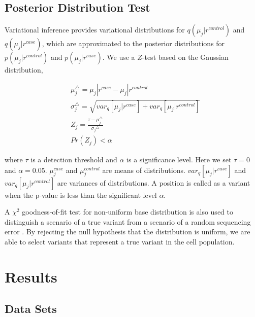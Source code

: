 \documentclass[11pt,reqno]{amsart}
\begin{document}
\subsection{Posterior Distribution Test}
Variational inference provides variational distributions for $q(\mu_j|r^{control})$ and $q(\mu_j|r^{case})$, which are approximated to the posterior distributions for $p(\mu_j|r^{control})$ and $p(\mu_j|r^{case})$.
We use a $Z$-test based on the Gaussian distribution,

\begin{align}
\label{eq:test}
& \mu_j^{\triangle} = \mu_j|r^{case}-\mu_j|r^{control}\\
& \sigma_j^{\triangle} = \sqrt {var_q{[\mu_j|r^{case}]} + var_q{[\mu_j|r^{control}]}}\\
& Z_j = \frac{\tau - \mu_j^{\triangle}}{{\sigma_j}^{\triangle}}\\
& Pr(Z_j) < \alpha
\end{align}

where $\tau$ is a detection threshold and $\alpha$ is a significance level. Here we set $\tau = 0$ and $\alpha = 0.05$.
$\mu_j^{case}$ and $\mu_j^{control}$ are means of distributions.
$var_q{[\mu_j|r^{case}]}$ and  $var_q{[\mu_j|r^{control}]}$ are variances of distributions.
A position is called as a variant when the p-value is less than the significant level $\alpha$.

A $\chi^2$ goodness-of-fit test for non-uniform base distribution is also used to distinguish a scenario of a true variant from a scenario of a random sequencing error \citep{efron2010large, he2015rvd2}.
By rejecting the null hypothesis that the distribution is uniform, we are able to select variants that represent a true variant in the cell population.

\section{Results}
\subsection{Data Sets}
\end{document}
